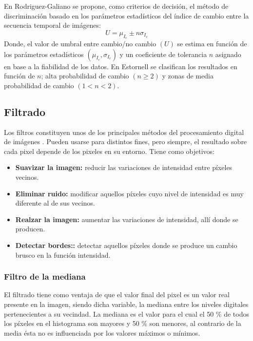 
En Rodriguez-Galiano \cite{rodriguez2010analisis} se propone, como criterios de decisi\'on, el m\'etodo de discriminaci\'on basado en los par\'ametros estad\'isticos del \'indice de cambio entre la secuencia temporal de im\'agenes:
\begin{equation}
U=\mu_{I_{c}} \pm n\sigma _{I_{c}}
\end{equation}
Donde, el valor de umbral entre cambio/no cambio $ (U) $ se estima en funci\'on de los par\'ametros estad\'isticos $ (\mu_{I_{c}}, \sigma_{I_{c}}) $ y un coeficiente de tolerancia $ n $ asignado en base a la fiabilidad de los datos. En Estornell \cite{estornell2004analisis} se clasifican los resultados en funci\'on de $ n $; alta probabilidad de cambio $ (n \geq 2) $ y
zonas de media probabilidad de cambio $ (1 < n < 2) $.

\subsection{Filtrado}
Los filtros constituyen unos de los principales m\'etodos del procesamiento digital de im\'agenes . Pueden usarse para distintos fines, pero siempre, el resultado sobre cada pixel depende de los pixeles en su entorno. Tiene como objetivos: 
	\begin{itemize}
		\item \textbf{Suavizar la imagen:} reducir las variaciones de intensidad entre p\'ixeles vecinos.
		\item \textbf{Eliminar ruido:}  modificar aquellos p\'ixeles cuyo nivel de intensidad es muy diferente al de sus vecinos.
		\item \textbf{Realzar la imagen:} aumentar las variaciones de intensidad, all\'i donde se producen.
		\item \textbf{Detectar bordes::} detectar aquellos p\'ixeles donde se produce un cambio brusco en la funci\'on intensidad.	
	\end{itemize}
\subsubsection{Filtro de la mediana}\label{subsec:filMediana}
El filtrado tiene como ventaja de que el valor final del pixel es un valor real presente en la imagen, siendo dicha variable, la mediana entre los niveles digitales pertenecientes a su vecindad. La mediana es el valor para el cual el 50 \% de todos los p\'ixeles en el histograma son mayores y 50 \% son menores, al contrario de la media \'esta no es influenciada por los valores m\'aximos o m\'inimos\cite{mehl1997fundamentos}.

